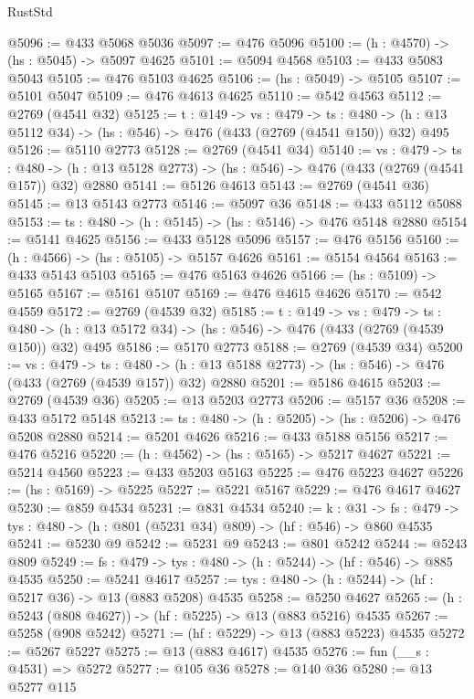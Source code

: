 \begin{lexlean}{RustStd}
\begin{coremodule}
@5096 := @433 @5068 @5036
@5097 := @476 @5096
@5100 := (h : @4570) -> (hs : @5045) -> @5097 @4625
@5101 := @5094 @4568
@5103 := @433 @5083 @5043
@5105 := @476 @5103 @4625
@5106 := (hs : @5049) -> @5105
@5107 := @5101 @5047
@5109 := @476 @4613 @4625
@5110 := @542 @4563
@5112 := @2769 (@4541 @32)
@5125 := {t : @149} ->
  {vs : @479} ->
  {ts : @480} -> (h : @13 @5112 @34) -> (hs : @546) -> @476 (@433 (@2769 (@4541 @150)) @32) @495
@5126 := @5110 @2773
@5128 := @2769 (@4541 @34)
@5140 := {vs : @479} ->
  {ts : @480} -> (h : @13 @5128 @2773) -> (hs : @546) -> @476 (@433 (@2769 (@4541 @157)) @32) @2880
@5141 := @5126 @4613
@5143 := @2769 (@4541 @36)
@5145 := @13 @5143 @2773
@5146 := @5097 @36
@5148 := @433 @5112 @5088
@5153 := {ts : @480} -> (h : @5145) -> (hs : @5146) -> @476 @5148 @2880
@5154 := @5141 @4625
@5156 := @433 @5128 @5096
@5157 := @476 @5156
@5160 := (h : @4566) -> (hs : @5105) -> @5157 @4626
@5161 := @5154 @4564
@5163 := @433 @5143 @5103
@5165 := @476 @5163 @4626
@5166 := (hs : @5109) -> @5165
@5167 := @5161 @5107
@5169 := @476 @4615 @4626
@5170 := @542 @4559
@5172 := @2769 (@4539 @32)
@5185 := {t : @149} ->
  {vs : @479} ->
  {ts : @480} -> (h : @13 @5172 @34) -> (hs : @546) -> @476 (@433 (@2769 (@4539 @150)) @32) @495
@5186 := @5170 @2773
@5188 := @2769 (@4539 @34)
@5200 := {vs : @479} ->
  {ts : @480} -> (h : @13 @5188 @2773) -> (hs : @546) -> @476 (@433 (@2769 (@4539 @157)) @32) @2880
@5201 := @5186 @4615
@5203 := @2769 (@4539 @36)
@5205 := @13 @5203 @2773
@5206 := @5157 @36
@5208 := @433 @5172 @5148
@5213 := {ts : @480} -> (h : @5205) -> (hs : @5206) -> @476 @5208 @2880
@5214 := @5201 @4626
@5216 := @433 @5188 @5156
@5217 := @476 @5216
@5220 := (h : @4562) -> (hs : @5165) -> @5217 @4627
@5221 := @5214 @4560
@5223 := @433 @5203 @5163
@5225 := @476 @5223 @4627
@5226 := (hs : @5169) -> @5225
@5227 := @5221 @5167
@5229 := @476 @4617 @4627
@5230 := @859 @4534
@5231 := @831 @4534
@5240 := {k : @31} ->
  {fs : @479} -> {tys : @480} -> (h : @801 (@5231 @34) @809) -> (hf : @546) -> @860 @4535
@5241 := @5230 @9
@5242 := @5231 @9
@5243 := @801 @5242
@5244 := @5243 @809
@5249 := {fs : @479} -> {tys : @480} -> (h : @5244) -> (hf : @546) -> @885 @4535
@5250 := @5241 @4617
@5257 := {tys : @480} -> (h : @5244) -> (hf : @5217 @36) -> @13 (@883 @5208) @4535
@5258 := @5250 @4627
@5265 := (h : @5243 (@808 @4627)) -> (hf : @5225) -> @13 (@883 @5216) @4535
@5267 := @5258 (@908 @5242)
@5271 := (hf : @5229) -> @13 (@883 @5223) @4535
@5272 := @5267 @5227
@5275 := @13 (@883 @4617) @4535
@5276 := fun (__s : @4531) => @5272
@5277 := @105 @36
@5278 := @140 @36
@5280 := @13 @5277 @115

\end{coremodule}
\end{lexlean}
